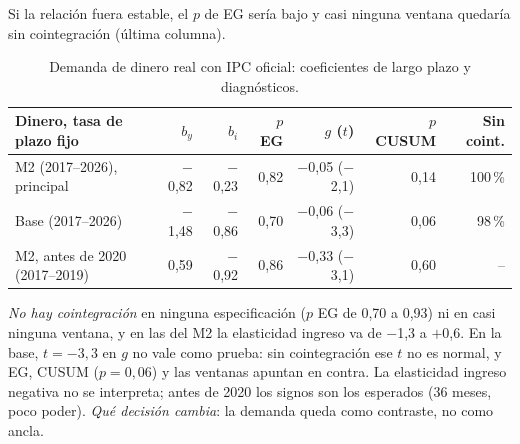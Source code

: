  Si la relación fuera estable, el $p$ de EG sería bajo y casi ninguna ventana quedaría sin cointegración (última columna).

\begin{table}[H]\centering\small
\caption{Demanda de dinero real con IPC oficial: coeficientes de largo plazo y diagnósticos.}\label{t:B}
\setlength{\tabcolsep}{4.5pt}
\begin{tabular}{@{}lrrrrrr@{}}
\toprule
Dinero, tasa de plazo fijo & $b_y$ & $b_i$ & $p$ EG & $g$ ($t$) & $p$ CUSUM & Sin coint.\\
\midrule
M2 (2017--2026), principal & $-$0,82 & $-$0,23 & 0,82 & $-$0,05 ($-$2,1) & 0,14 & 100\,\%\\
Base (2017--2026) & $-$1,48 & $-$0,86 & 0,70 & $-$0,06 ($-$3,3) & 0,06 & 98\,\%\\
M2, antes de 2020 (2017--2019) & 0,59 & $-$0,92 & 0,86 & $-$0,33 ($-$3,1) & 0,60 & --\\
\bottomrule
\end{tabular}
\end{table}

 \emph{No hay cointegración} en ninguna especificación ($p$ EG de 0,70 a 0,93) ni en casi ninguna ventana, y en las del M2 la elasticidad ingreso va de $-$1,3 a $+$0,6. En la base, $t=-3{,}3$ en $g$ no vale como prueba: sin cointegración ese $t$ no es normal, y EG, CUSUM ($p=0{,}06$) y las ventanas apuntan en contra. La elasticidad ingreso negativa no se interpreta; antes de 2020 los signos son los esperados (36 meses, poco poder). \emph{Qué decisión cambia}: la demanda queda como contraste, no como ancla.

